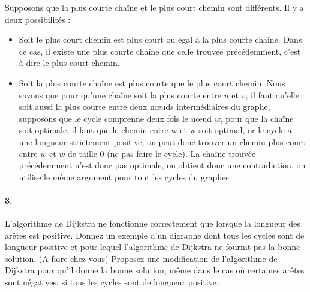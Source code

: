 \begin{solution}
  Supposons que la plus courte chaîne et le plus court chemin sont différents. Il y a deux possibilités :
  \begin{itemize}
    \item Soit le plus court chemin est plus court ou égal à la plus courte chaîne. Dans ce cas, il existe une plus courte chaîne que celle trouvée précédemment, c'est à dire le plus court chemin.
    \item Soit la plus courte chaîne est plus courte que le plus court chemin.
      Nous savons que pour qu'une chaîne soit la plus courte entre $u$ et $v$,
      il faut qu'elle soit aussi la plus courte entre deux nœuds intermédiaires du graphe,
      supposons que le cycle comprenne deux fois le nœud $w$,
      pour que la chaîne soit optimale, il faut que le chemin entre w et w soit optimal,
      or le cycle a une longueur strictement positive,
      on peut donc trouver un chemin plus court entre $w$ et $w$ de taille 0 (ne pas faire le cycle).
      La chaîne trouvée précédemment n'est donc pas optimale, on obtient donc une contradiction,
      on utilise le même argument pour tout les cycles du graphes.
  \end{itemize}
\end{solution}

\paragraph{3. } L'algorithme de Dijkstra ne fonctionne correctement que lorsque la longueur des arêtes est positive. Donnez un exemple d'un digraphe dont tous les cycles sont de longueur positive et pour lequel l'algorithme de Dijkstra ne fournit pas la bonne solution. (A faire chez vous) Proposez une modification de l'algorithme de Dijkstra pour qu'il donne la bonne solution, même dans le cas où certaines arêtes sont négatives, si tous les cycles sont de longueur positive.

